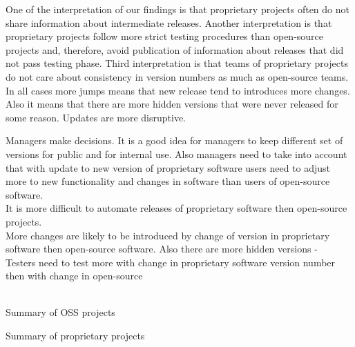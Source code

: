 \documentclass[conference]{IEEEtran}
\begin{document}
One of the interpretation of our findings is that proprietary projects often do not share information about intermediate releases. Another interpretation is that proprietary projects follow more strict testing procedures than open-source projects and, therefore, avoid publication of information about releases that did not pass testing phase.  Third interpretation is that teams of proprietary projects do not care about consistency in version numbers as much as open-source teams.
In all cases more jumps means that new release tend to introduces more changes. Also it means that there are more hidden versions that were never released for some reason. Updates are more disruptive. 



Managers make decisions. 
It is a good idea for managers to keep different set of versions for public and for internal use. 
Also managers need to take into account that with update to new version of proprietary software users need to adjust more to new functionality and changes in software than users of open-source software.
\\
It is more difficult to automate releases of proprietary software then open-source projects.
\\
More changes are likely to be introduced by change of version in proprietary software then open-source software. Also there are more hidden versions - 
\\
Testers need to test more with change in proprietary software version number then with change in open-source 
\\
\\

\begin{table*}[htb]
\begin{adjustbox}{width=\textwidth}
\end{adjustbox}
\caption{Summary of OSS projects}
\label{tab:ossProjectsInfo}
\end{table*}

\begin{table*}[htb]
\begin{adjustbox}{width=\textwidth}
\end{adjustbox}
\caption{Summary of proprietary projects}
\label{tab:proprietaryProjectsInfo}
\end{table*}
\end{document}
